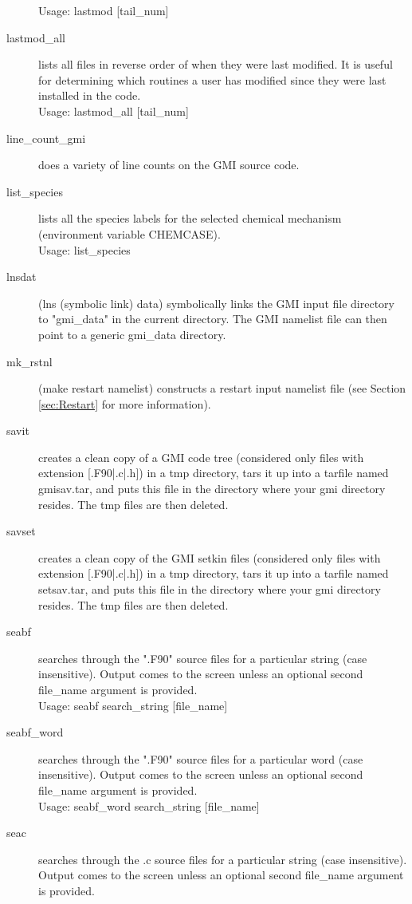 \begin{description}
   Usage:  lastmod [tail\_num]
\item[lastmod\_all] lists all files in reverse order of when 
   they were last modified. It is useful for determining which routines 
   a user has modified since they were last installed in the code. \\
   Usage:  lastmod\_all [tail\_num]
\item[line\_count\_gmi] does a variety of line counts on the GMI source code.
\item[list\_species] lists all the species labels for the selected chemical
    mechanism (environment variable CHEMCASE). \\
   Usage: list\_species
\item[lnsdat] (lns (symbolic link) data) symbolically links the GMI input 
   file directory to "gmi\_data" in the current directory.  
   The GMI namelist file can then point to a generic gmi\_data directory.
\item[mk\_rstnl] (make restart namelist) constructs a restart input namelist 
   file (see Section \ref{sec:Restart} for more information).
\item[savit] creates a clean copy of a GMI code tree (considered only
   files with extension [.F90|.c|.h]) in a tmp
   directory, tars it up into a tarfile named gmisav.tar, and puts this
   file in the directory where your gmi directory resides.  The tmp
   files are then deleted.
\item[savset] creates a clean copy of the GMI setkin files
   (considered only files with extension [.F90|.c|.h]) in a tmp
   directory, tars it up into a tarfile named setsav.tar, and puts this
   file in the directory where your gmi directory resides.  The tmp
   files are then deleted.
\item[seabf] searches through the ".F90" source files for a
   particular string (case insensitive). Output comes to the screen
   unless an optional second file\_name argument is provided. \\
   Usage: seabf search\_string [file\_name]
\item[seabf\_word] searches through the ".F90" source files for a
   particular word (case insensitive).  Output comes to the screen
   unless an optional second file\_name argument is provided. \\
   Usage:  seabf\_word search\_string [file\_name]
\item[seac] searches through the .c source files for a
   particular string (case insensitive).  Output comes to the screen
   unless an optional second file\_name argument is provided. \\

\end{description}
